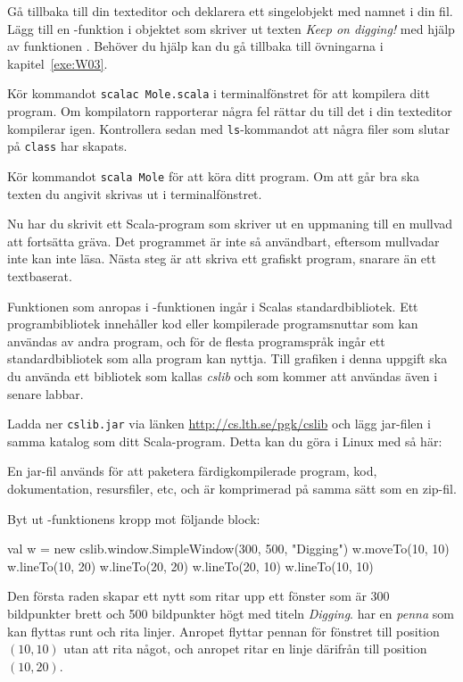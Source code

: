 \Subtask
Gå tillbaka till din texteditor och deklarera ett singelobjekt med namnet  i din fil.
Lägg till en -funktion i objektet som skriver ut texten \emph{Keep on digging!} med hjälp av funktionen .
Behöver du hjälp kan du gå tillbaka till övningarna i kapitel~\ref{exe:W03}.

\Subtask
Kör kommandot \texttt{scalac Mole.scala} i terminalfönstret för att kompilera ditt program.
Om kompilatorn rapporterar några fel rättar du till det i din texteditor kompilerar igen.
Kontrollera sedan med \texttt{ls}-kommandot att några filer som slutar på \texttt{class} har skapats.

\Subtask
Kör kommandot \texttt{scala Mole} för att köra ditt program.
Om att går bra ska texten du angivit skrivas ut i terminalfönstret.


\Task
Nu har du skrivit ett Scala-program som skriver ut en uppmaning till en mullvad att fortsätta gräva.
Det programmet är inte så användbart, eftersom mullvadar inte kan inte läsa.
Nästa steg är att skriva ett grafiskt program, snarare än ett textbaserat.

Funktionen  som anropas i -funktionen ingår i Scalas standardbibliotek.
Ett programbibliotek innehåller kod eller kompilerade programsnuttar som kan användas av andra program, och för de flesta programspråk ingår ett standardbibliotek som alla program kan nyttja.
Till grafiken i denna uppgift ska du använda ett bibliotek som kallas \emph{cslib} och som kommer att användas även i senare labbar.

\Subtask
Ladda ner \texttt{cslib.jar} via länken \url{http://cs.lth.se/pgk/cslib} och lägg jar-filen i samma katalog som ditt Scala-program. Detta kan du göra i Linux med  så här:
En jar-fil används för att paketera färdigkompilerade program, kod, dokumentation, resursfiler, etc, och är komprimerad på samma sätt som en zip-fil.

\Subtask
Byt ut -funktionens kropp mot följande block:
\begin{Code}
{
	val w = new cslib.window.SimpleWindow(300, 500, "Digging")
	w.moveTo(10, 10)
	w.lineTo(10, 20)
	w.lineTo(20, 20)
	w.lineTo(20, 10)
	w.lineTo(10, 10)
}
\end{Code}
Den första raden skapar ett nytt  som ritar upp ett fönster som är 300 bildpunkter brett och 500 bildpunkter högt med titeln \emph{Digging}.
 har en \emph{penna} som kan flyttas runt och rita linjer.
Anropet  flyttar pennan för fönstret  till position $(10,10)$ utan att rita något, och anropet  ritar en linje därifrån till position $(10, 20)$.

